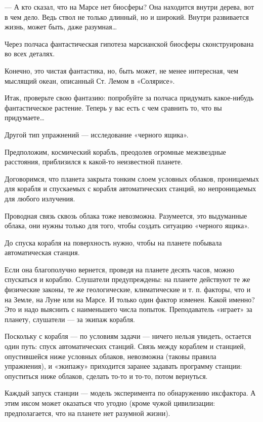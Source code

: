 — А кто сказал,  что на Марсе нет  биосферы? Она находится внутри  дерева,
вот в  чем  дело. Ведь  ствол  не только  длинный,  но и  широкий.  Внутри
развивается жизнь, может быть, даже разумная…

Через полчаса фантастическая гипотеза марсианской биосферы сконструирована
во всех деталях.

Конечно, это чистая фантастика, но,  быть может, не менее интересная,  чем
мыслящий океан, описанный Ст. Лемом в «Солярисе».

Итак,  проверьте   свою   фантазию:  попробуйте   за   полчаса   придумать
какое-нибудь фантастическое растение. Теперь у вас есть с чем сравнить то,
что вы придумаете…

Другой тип упражнений — исследование «черного ящика».

Предположим,   космический   корабль,   преодолев   огромные   межзвездные
расстояния, приблизился к какой-то неизвестной планете.

Договоримся,  что   планета  закрыта   тонким  слоем   условных   облаков,
проницаемых для корабля и спускаемых с корабля автоматических станций,  но
непроницаемых для любого излучения.

Проводная связь сквозь облака тоже невозможна. Разумеется, это  выдуманные
облака, они нужны только для того, чтобы создать ситуацию «черного ящика».

До  спуска  корабля  на  поверхность  нужно,  чтобы  на  планете  побывала
автоматическая станция.

Если она благополучно  вернется, проведя  на планете  десять часов,  можно
спускаться и кораблю. Слушатели предупреждены: на планете действуют те  же
физические законы, те же геологические, климатические и т. п. факторы, что
и на Земле,  на Луне или  на Марсе.  И только один  фактор изменен.  Какой
именно? Это и  надо выяснить  с наименьшего  числа попыток.  Преподаватель
«играет» за планету, слушатели — за экипаж корабля.

Поскольку с корабля — по условиям задачи — ничего нельзя увидеть, остается
один путь: спуск автоматических станций. Связь между кораблем и  станцией,
опустившейся   ниже   условных   облаков,   невозможна   (таковы   правила
упражнения), и «экипажу»  приходится заранее  задавать программу  станции:
опуститься ниже облаков, сделать то-то и то-то, потом вернуться.

Каждый запуск станции — модель  эксперимента по обнаружению иксфактора.  А
этим  иксом  может   оказаться  что  угодно   (кроме  чужой   цивилизации:
предполагается, что на планете нет разумной жизни).

